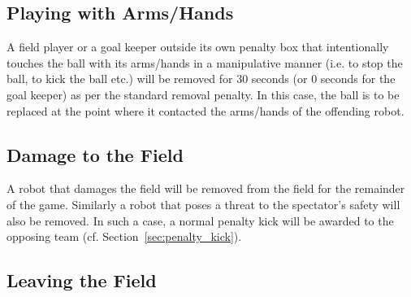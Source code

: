 \documentclass[12pt]{article}
\newcommand{\cf}{\mbox{cf.}\xspace}
\begin{document}
%
%
%
%
%

\subsection{Playing with Arms/Hands}
\label{sec:hand_ball}
A field player or a goal keeper outside its own penalty box that intentionally touches the ball with its arms/hands in a manipulative manner (i.e. to stop the ball, to kick the ball etc.) will be removed for 30 seconds (or 0 seconds for the goal keeper) as per the standard removal penalty. In this case, the ball is to be replaced at the point where it contacted the arms/hands of the offending robot.


\subsection{Damage to the Field}

A robot that damages the field
will be removed from the field for the remainder
of the game. Similarly a robot that poses a threat to the
spectator's safety will also be removed. In such a case, a normal
penalty kick will be awarded to the opposing team (\cf
Section~\ref{sec:penalty_kick}).

\subsection{Leaving the Field}
\end{document}
